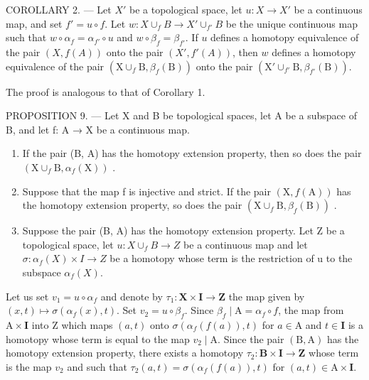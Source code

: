 COROLLARY 2. --- Let \(X'\) be a topological space, let \(u: X \to X'\) be a continuous map, and set \(f' = u \circ f\). Let \(w: X \cup_f B \to X' \cup_{f'} B\) be the unique continuous map such that \(w \circ \alpha_f = \alpha_{f'} \circ u\) and \(w \circ \beta_f = \beta_{f'}\). If \(u\) defines a homotopy equivalence of the pair \((X, f(A))\) onto the pair \((X', f'(A))\), then \(w\) defines a homotopy equivalence of the pair \((\mathrm{X}\cup_f\mathrm{B},\beta_f(\mathrm{B}))\) onto the pair \((\mathrm{X}'\cup_{f'}\mathrm{B},\beta_{f'}(\mathrm{B}))\).

The proof is analogous to that of Corollary 1.

PROPOSITION 9. --- Let X and B be topological spaces, let A be a subspace of B, and let f: A → X be a continuous map.

\begin{enumerate}
\def\labelenumi{\alph{enumi})}
\item
  If the pair (B, A) has the homotopy extension property, then so does the pair \((\mathrm{X} \cup_{f} \mathrm{B}, \alpha_{f}(\mathrm{X}))\) .
\item
  Suppose that the map f is injective and strict. If the pair \((\mathrm{X}, f(\mathrm{A}))\) has the homotopy extension property, so does the pair \((\mathrm{X} \cup_{f} \mathrm{B}, \beta_{f}(\mathrm{B}))\) .
\item
  Suppose the pair (B, A) has the homotopy extension property. Let Z be a topological space, let \(u: X \cup_{f} B \to Z\) be a continuous map and let \(\sigma: \alpha_{f}(X) \times I \to Z\) be a homotopy whose term is the restriction of u to the subspace \(\alpha_{f}(X)\).
\end{enumerate}

Let us set \(v_{1} = u \circ \alpha_{f}\) and denote by \(\tau_{1} \colon \mathbf{X} \times \mathbf{I} \to \mathbf{Z}\) the map given by \((x,t) \mapsto \sigma(\alpha_{f}(x),t)\). Set \(v_{2} = u \circ \beta_{f}\). Since \(\beta_{f} \mid \mathrm{A} = \alpha_{f} \circ f\), the map from \(\mathrm{A} \times \mathbf{I}\) into \(\mathrm{Z}\) which maps \((a,t)\) onto \(\sigma(\alpha_{f}(f(a)),t)\) for \(a \in \mathrm{A}\) and \(t \in \mathbf{I}\) is a homotopy whose term is equal to the map \(v_{2} \mid \mathrm{A}\). Since the pair \((\mathrm{B},\mathrm{A})\) has the homotopy extension property, there exists a homotopy \(\tau_{2} \colon \mathbf{B} \times \mathbf{I} \to \mathbf{Z}\) whose term is the map \(v_{2}\) and such that \(\tau_{2}(a,t) = \sigma(\alpha_{f}(f(a)),t)\) for \((a,t) \in \mathrm{A} \times \mathbf{I}\).

